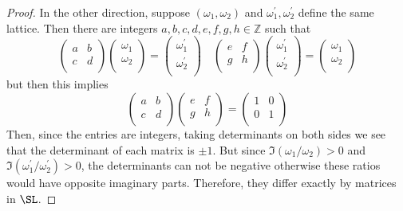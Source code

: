 \documentclass[12pt]{article}
\theoremstyle{definition}
\begin{document}
\begin{proof}
In the other direction, suppose \((\omega _1,\omega _2)\) and \(\omega _1^{\prime} ,\omega _2^{\prime} \) define the same lattice. Then there are integers \(a,b,c,d,e,f,g,h \in \mathbb{Z} \) such that 
\[
    \begin{pmatrix}
        a &  b \\
        c &  d \\
    \end{pmatrix} \begin{pmatrix}
        \omega _1  \\
        \omega _2  \\
    \end{pmatrix} = \begin{pmatrix}
        \omega _1^{\prime}   \\
        \omega _2^{\prime}   \\
    \end{pmatrix} \quad \begin{pmatrix}
        e&  f \\
        g &  h \\
    \end{pmatrix} \begin{pmatrix}
        \omega _1^{\prime}   \\
        \omega _2 ^{\prime}  \\
    \end{pmatrix} = \begin{pmatrix}
        \omega _1  \\
        \omega _2  \\
    \end{pmatrix}
\]  
but then this implies
\[
    \begin{pmatrix}
        a &  b \\
        c &  d \\
    \end{pmatrix}\begin{pmatrix}
        e&  f \\
        g &  h \\
    \end{pmatrix} = \begin{pmatrix}
        1 &  0 \\
        0 &  1 \\
    \end{pmatrix}
\]
Then, since the entries are integers, taking determinants on both sides we see that the determinant of each matrix is \(\pm 1\). But since \(\Im (\omega_1/\omega _2)>0\) and \(\Im (\omega_1^{\prime} /\omega _2^{\prime} )>0\), the determinants can not be negative otherwise these ratios would have opposite imaginary parts. Therefore, they differ exactly by matrices in \(\SL\).    
\end{proof}
\end{document}
